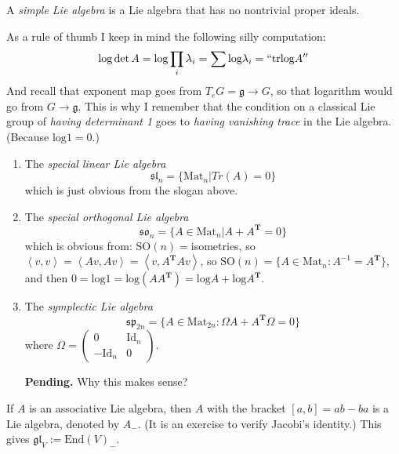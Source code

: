 \begin{definition}
\label{definition-simple-Lie-algebra}
A {\it simple Lie algebra} is a
Lie algebra that has no
nontrivial proper ideals.
\end{definition}

As a rule of thumb I keep in mind the
following silly computation:
$$
\text{log}\det A=\text{log}
\prod_{i}\lambda_i=\sum \text{log}\lambda_i
=``\text{tr}\text{log}A''
$$
And recall that exponent map goes from $T_eG=
\mathfrak{g} \to G$, so that
logarithm would go from $G\to \mathfrak{g}$.
This is why I remember that the
condition on a classical Lie group of
{\it having determinant 1} goes to {\it
having vanishing trace} in the
Lie algebra. (Because $\text{log}1=0$.)

\begin{example}
\label{example-Lie-algebras}
\begin{enumerate}
\item The {\it special linear Lie algebra}
$$
\mathfrak{sl}_n=\{\text{Mat}_n|Tr(A)=0\}
$$
which is just obvious from the slogan above.
\item The {\it special orthogonal Lie
algebra}
$$
\mathfrak{so}_n=\{A\in
\text{Mat}_n|A+A^{\mathbf{T}}=0\}
$$
which is obvious from:
$\text{SO}(n)=$isometries, so
$\left\langle{}v,v\right\rangle{}=\left\langle{}Av,Av\right\rangle{}=\left\langle{}v,
A^{\mathbf{T}}Av\right\rangle{}$,
so
$\text{SO}(n)=\{A \in
\text{Mat}_n:A^{-1}=A^{\mathbf{T}}\}$, and
then
$0=
\text{log}1=\text{log}(A
A^{\mathbf{T}})=\text{log}A+\text{log}
A^{\mathbf{T}}$.

\item The {\it symplectic Lie algebra}
$$
\mathfrak{sp}_{2n}=\{A \in
\text{Mat}_{2n}:\Omega
A+A^{\mathbf{T}}\Omega=0\}
$$
where $\Omega=\begin{pmatrix}
0&\text{Id}_n\\
-\text{Id}_n & 0
\end{pmatrix}$.

{\bf Pending.} Why this makes sense?
\end{enumerate}
\end{example}

\begin{example}
\label{example-assoc-algeb-gives-lie-algeb}
If $A$ is an associative Lie algebra,
then $A$ with the bracket  $[a,b]=ab-ba$
is a Lie algebra, denoted by  $A_-$.
(It is an exercise to verify Jacobi's
identity.) This gives
 $\mathfrak{gl}_V:=\text{End}(V)_-$.
\end{example}

